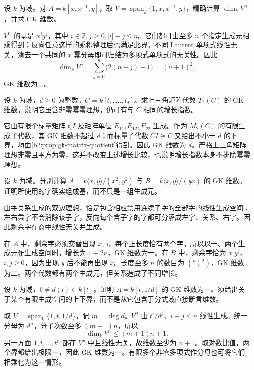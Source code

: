 \begin{optionalexercise}\label{b2:ex:19-partial-laurent-growth}
	设 \(k\) 为域。对 \(A=k[x,x^{-1},y]\)，取 \(V=\operatorname{span}_k\{1,x,x^{-1},y\}\)，精确计算 \(\dim_kV^n\)，并求 GK 维数。
\end{optionalexercise}
\begin{solution}
	\(V^n\) 的基是 \(x^iy^j\)，其中 \(i\in\mathbb Z,j\ge0,|i|+j\le n\)。它们都可由至多 \(n\) 个指定生成元相乘得到；反向任意这样的乘积整理后也满足此界。不同 Laurent 单项式线性无关，清去一个共同的 \(x\) 幂分母即可归结为多项式单项式的无关性。因此
	\[
		\dim_kV^n=\sum_{j=0}^n\bigl(2(n-j)+1\bigr)=(n+1)^2,
	\]
	GK 维数为二。
\end{solution}

\begin{optionalexercise}\label{b2:ex:19-triangular-growth}
	设 \(k\) 为域，\(d\ge0\) 为整数，\(C=k[t_1,\ldots,t_d]\)。求上三角矩阵代数 \(T_2(C)\) 的 GK 维数，说明它虽含非零幂零理想，仍可有与 \(C\) 相同的增长指数。
\end{optionalexercise}
\begin{solution}
	它由有限个标量矩阵 \(t_iI\) 及矩阵单位 \(E_{11},E_{12},E_{22}\) 生成。作为 \(M_2(C)\) 的有限生成子代数，其 GK 维数不超过 \(d\)；而标量子代数 \(CI\cong C\) 又给出不小于 \(d\) 的下界，均由\cref{b2:prop:gk-matrix-quotient}得到。因此 GK 维数为 \(d\)。严格上三角矩阵理想非零且平方为零，这并不改变上述增长比较，也说明增长指数本身不排除幂零理想。
\end{solution}

\begin{optionalexercise}\label{b2:ex:19-monomial-quotient-growth}
	设 \(k\) 为域。分别计算 \(A=k\langle x,y\rangle/(x^2,y^2)\) 与 \(B=k\langle x,y\rangle/(yx)\) 的 GK 维数。证明所使用的字确实组成基，而不只是一组生成元。
\end{optionalexercise}
\begin{solution}
	由字关系生成的双边理想，恰是包含相应禁用连续子字的全部字的线性生成空间：左右乘字不会消除该子字，反向每个含子字的字都可分解成左字、关系、右字。因此剩余字在商中线性无关并生成。

	在 \(A\) 中，剩余字必须交替出现 \(x,y\)，每个正长度恰有两个字，所以以一、两个生成元作生成空间时，增长为 \(1+2n\)，GK 维数为一。在 \(B\) 中，剩余字恰为 \(x^iy^j\)、\(i,j\ge0\)，因为出现 \(y\) 后不能再出现 \(x\)。长度至多 \(n\) 的数目为 \(\binom{n+2}{2}\)，GK 维数为二。两个代数都有两个生成元，但关系造成了不同增长。
\end{solution}

\begin{optionalexercise}\label{b2:ex:19-finite-denominator-growth}
	设 \(k\) 为域，\(0\ne d(t)\in k[t]\)。证明 \(A=k[t,1/d]\) 的 GK 维数为一。须给出关于某个有限生成空间的上下界，而不是从它包含于分式域直接断言维数。
\end{optionalexercise}
\begin{solution}
	取 \(V=\operatorname{span}_k\{1,t,1/d\}\)，记 \(m=\deg d\)。\(V^n\) 由 \(t^i/d^j\)、\(i+j\le n\) 线性生成。统一分母为 \(d^n\)，分子次数至多 \((m+1)n\)，所以
	\[
		\dim_kV^n\le(m+1)n+1.
	\]
	另一方面 \(1,t,\ldots,t^n\) 都在 \(V^n\) 中且线性无关，故维数至少为 \(n+1\)。取对数比值，两个界都给出极限一，因此 GK 维数为一。有限多个非零多项式作分母也可将它们相乘化为这一情形。
\end{solution}
